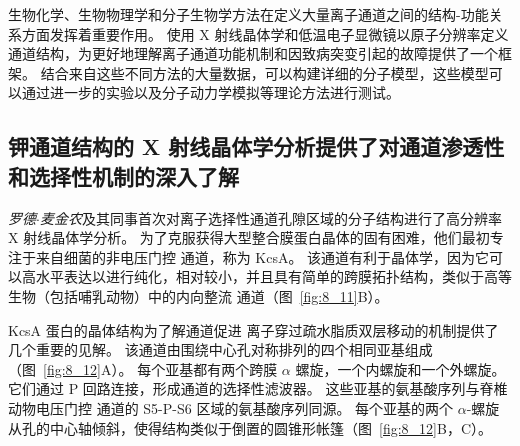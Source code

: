 生物化学、生物物理学和分子生物学方法在定义大量离子通道之间的结构-功能关系方面发挥着重要作用。
使用 X 射线晶体学和低温电子显微镜以原子分辨率定义通道结构，为更好地理解离子通道功能机制和因致病突变引起的故障提供了一个框架。
结合来自这些不同方法的大量数据，可以构建详细的分子模型，这些模型可以通过进一步的实验以及分子动力学模拟等理论方法进行测试。





\subsection{钾通道结构的 X 射线晶体学分析提供了对通道渗透性和选择性机制的深入了解}

\textit{罗德$\cdot$麦金农}及其同事首次对离子选择性通道孔隙区域的分子结构进行了高分辨率 X 射线晶体学分析。
为了克服获得大型整合膜蛋白晶体的固有困难，他们最初专注于来自细菌的非电压门控  通道，称为 KcsA。 
该通道有利于晶体学，因为它可以高水平表达以进行纯化，相对较小，并且具有简单的跨膜拓扑结构，类似于高等生物（包括哺乳动物）中的内向整流  通道（图~\ref{fig:8_11}B）。


KcsA 蛋白的晶体结构为了解通道促进  离子穿过疏水脂质双层移动的机制提供了几个重要的见解。
该通道由围绕中心孔对称排列的四个相同亚基组成（图~\ref{fig:8_12}A）。
每个亚基都有两个跨膜 $\alpha$ 螺旋，一个内螺旋和一个外螺旋。
它们通过 P 回路连接，形成通道的选择性滤波器。
这些亚基的氨基酸序列与脊椎动物电压门控  通道的 S5-P-S6 区域的氨基酸序列同源。
每个亚基的两个 $\alpha$-螺旋从孔的中心轴倾斜，使得结构类似于倒置的圆锥形帐篷（图~\ref{fig:8_12}B，C）。



